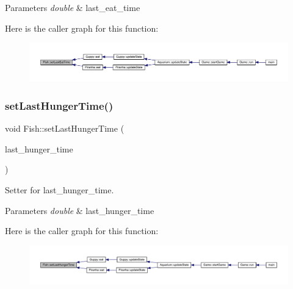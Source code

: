 \begin{DoxyParams}{Parameters}
{\em double} & last\+\_\+eat\+\_\+time \\
\hline
\end{DoxyParams}
Here is the caller graph for this function\+:\nopagebreak
\begin{figure}[H]
\begin{center}
\leavevmode
\includegraphics[width=350pt]{class_fish_ad53bd870836825ab0cc4b4d987325772_icgraph}
\end{center}
\end{figure}
\mbox{\label{class_fish_aca013c7fba46ca20ab12909945e535d4}} 
\subsubsection{\texorpdfstring{set\+Last\+Hunger\+Time()}{setLastHungerTime()}}
{\footnotesize\ttfamily void Fish\+::set\+Last\+Hunger\+Time (\begin{DoxyParamCaption}\item[{double}]{last\+\_\+hunger\+\_\+time }\end{DoxyParamCaption})}



Setter for last\+\_\+hunger\+\_\+time. 


\begin{DoxyParams}{Parameters}
{\em double} & last\+\_\+hunger\+\_\+time \\
\hline
\end{DoxyParams}
Here is the caller graph for this function\+:\nopagebreak
\begin{figure}[H]
\begin{center}
\leavevmode
\includegraphics[width=350pt]{class_fish_aca013c7fba46ca20ab12909945e535d4_icgraph}
\end{center}
\end{figure}
\mbox{\label{class_fish_a883d6bd47ac65d319269eee4c46cf461}} 
